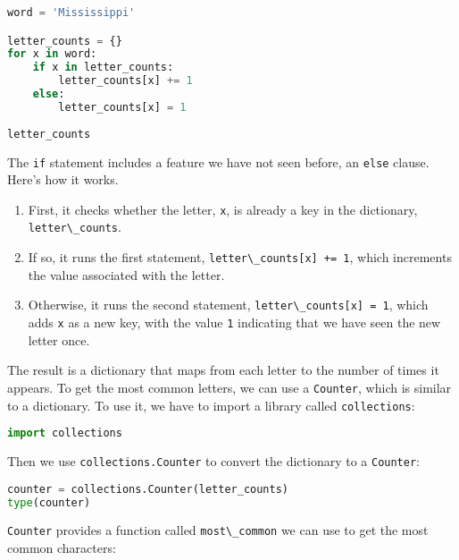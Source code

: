 \begin{lstlisting}[language=Python,style=source]
word = 'Mississippi'

letter_counts = {}
for x in word:
    if x in letter_counts:
        letter_counts[x] += 1
    else:
        letter_counts[x] = 1
        
letter_counts
\end{lstlisting}

The \passthrough{\lstinline!if!} statement includes a feature we have
not seen before, an \passthrough{\lstinline!else!} clause. Here's how it
works.

\begin{enumerate}
\def\labelenumi{\arabic{enumi}.}
\item
  First, it checks whether the letter, \passthrough{\lstinline!x!}, is
  already a key in the dictionary,
  \passthrough{\lstinline!letter\_counts!}.
\item
  If so, it runs the first statement,
  \passthrough{\lstinline!letter\_counts[x] += 1!}, which increments the
  value associated with the letter.
\item
  Otherwise, it runs the second statement,
  \passthrough{\lstinline!letter\_counts[x] = 1!}, which adds
  \passthrough{\lstinline!x!} as a new key, with the value
  \passthrough{\lstinline!1!} indicating that we have seen the new
  letter once.
\end{enumerate}

The result is a dictionary that maps from each letter to the number of
times it appears. To get the most common letters, we can use a
\passthrough{\lstinline!Counter!}, which is similar to a dictionary. To
use it, we have to import a library called
\passthrough{\lstinline!collections!}:

\begin{lstlisting}[language=Python,style=source]
import collections
\end{lstlisting}

Then we use \passthrough{\lstinline!collections.Counter!} to convert the
dictionary to a \passthrough{\lstinline!Counter!}:

\begin{lstlisting}[language=Python,style=source]
counter = collections.Counter(letter_counts)
type(counter)
\end{lstlisting}

\passthrough{\lstinline!Counter!} provides a function called
\passthrough{\lstinline!most\_common!} we can use to get the most common
characters:

